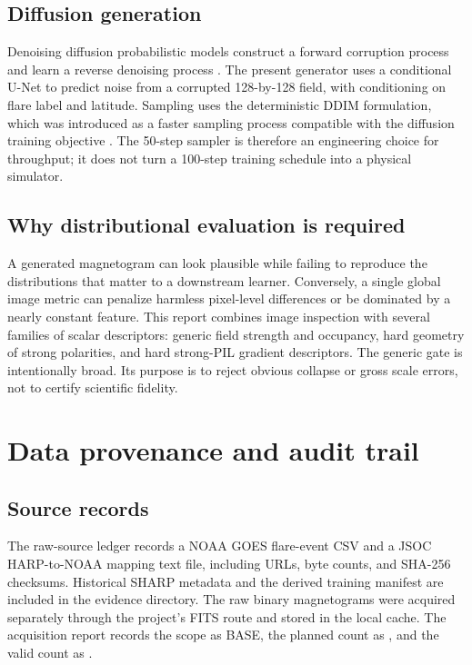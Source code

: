 \documentclass[11pt,oneside]{report}
\begin{document}
\section{Diffusion generation}

Denoising diffusion probabilistic models construct a forward corruption process and learn a reverse denoising process \cite{ho2020}. The present generator uses a conditional U-Net to predict noise from a corrupted 128-by-128 field, with conditioning on flare label and latitude. Sampling uses the deterministic DDIM formulation, which was introduced as a faster sampling process compatible with the diffusion training objective \cite{song2020ddim}. The 50-step sampler is therefore an engineering choice for throughput; it does not turn a 100-step training schedule into a physical simulator.

\section{Why distributional evaluation is required}

A generated magnetogram can look plausible while failing to reproduce the distributions that matter to a downstream learner. Conversely, a single global image metric can penalize harmless pixel-level differences or be dominated by a nearly constant feature. This report combines image inspection with several families of scalar descriptors: generic field strength and occupancy, hard geometry of strong polarities, and hard strong-PIL gradient descriptors. The generic gate is intentionally broad. Its purpose is to reject obvious collapse or gross scale errors, not to certify scientific fidelity.

\chapter{Data provenance and audit trail}

\section{Source records}

The raw-source ledger records a NOAA GOES flare-event CSV and a JSOC HARP-to-NOAA mapping text file, including URLs, byte counts, and SHA-256 checksums. Historical SHARP metadata and the derived training manifest are included in the evidence directory. The raw binary magnetograms were acquired separately through the project’s FITS route and stored in the local cache. The acquisition report records the scope as BASE, the planned count as \PlannedCount{}, and the valid count as \AcquiredCount{}.
\end{document}
